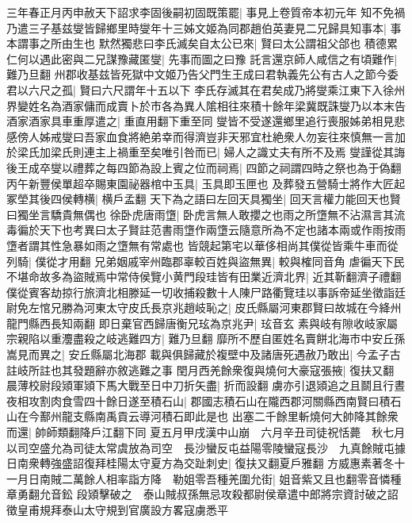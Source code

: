 三年春正月丙申赦天下詔求李固後嗣初固既策罷|{
	事見上卷質帝本初元年}
知不免禍乃遣三子基兹燮皆歸鄉里時燮年十三姊文姬為同郡趙伯英妻見二兄歸具知事本|{
	事本謂事之所由生也}
默然獨悲曰李氏滅矣自太公已來|{
	賢曰太公謂祖父郃也}
積德累仁何以遇此密與二兄謀豫藏匿燮|{
	先事而圖之曰豫}
託言還京師人咸信之有頃難作|{
	難乃旦翻}
州郡收基兹皆死獄中文姬乃告父門生王成曰君執義先公有古人之節今委君以六尺之孤|{
	賢曰六尺謂年十五以下}
李氏存滅其在君矣成乃將燮乘江東下入徐州界變姓名為酒家傭而成賣卜於市各為異人隂相往來積十餘年梁冀既誅燮乃以本末告酒家酒家具車重厚遣之|{
	重直用翻下重至同}
燮皆不受遂還鄉里追行喪服姊弟相見悲感傍人姊戒燮曰吾家血食將絶弟幸而得濟豈非天邪宜杜絶衆人勿妄往來慎無一言加於梁氏加梁氏則連主上禍重至矣唯引咎而已|{
	婦人之識丈夫有所不及焉}
燮謹從其誨後王成卒燮以禮葬之每四節為設上賓之位而祠焉|{
	四節之祠謂四時之祭也為于偽翻}
丙午新豐侯單超卒賜東園祕器棺中玉具|{
	玉具即玉匣也}
及葬發五營騎士將作大匠起冢塋其後四侯轉横|{
	横戶孟翻}
天下為之語曰左回天具獨坐|{
	回天言權力能回天也賢曰獨坐言驕貴無偶也}
徐卧虎唐雨墯|{
	卧虎言無人敢攖之也雨之所墯無不沾濕言其流毒徧於天下也考異曰太子賢註范書雨墯作兩墯云隨意所為不定也諸本兩或作雨按雨墯者謂其性急暴如雨之墯無有常處也}
皆競起第宅以華侈相尚其僕從皆乘牛車而從列騎|{
	僕從才用翻}
兄弟姻戚宰州臨郡辜較百姓與盜無異|{
	較與榷同音角}
虐徧天下民不堪命故多為盜賊焉中常侍侯覽小黄門段珪皆有田業近濟北界|{
	近其靳翻濟子禮翻}
僕從賓客劫掠行旅濟北相滕延一切收捕殺數十人陳尸路衢覽珪以事訴帝延坐徵詣廷尉免左悺兄勝為河東太守皮氏長京兆趙岐恥之|{
	皮氏縣屬河東郡賢曰故城在今絳州龍門縣西長知兩翻}
即日棄官西歸唐衡兄玹為京兆尹|{
	玹音玄}
素與岐有隙收岐家屬宗親陷以重灋盡殺之岐逃難四方|{
	難乃旦翻}
靡所不歷自匿姓名賣餅北海市中安丘孫嵩見而異之|{
	安丘縣屬北海郡}
載與俱歸藏於複壁中及諸唐死遇赦乃敢出|{
	今孟子古註岐所註也其發題辭亦敘逃難之事}
閏月西羌餘衆復與燒何大豪寇張掖|{
	復扶又翻}
晨薄校尉段熲軍熲下馬大戰至日中刀折矢盡|{
	折而設翻}
虜亦引退熲追之且鬬且行晝夜相攻割肉食雪四十餘日遂至積石山|{
	郡國志積石山在隴西郡河關縣西南賢曰積石山在今鄯州龍支縣南禹貢云導河積石即此是也}
出塞二千餘里斬燒何大帥降其餘衆而還|{
	帥師類翻降戶江翻下同}
夏五月甲戌漢中山崩　六月辛丑司徒祝恬薨　秋七月以司空盛允為司徒太常虞放為司空　長沙蠻反屯益陽零陵蠻寇長沙　九真餘賊屯據日南衆轉強盛詔復拜桂陽太守夏方為交趾刺史|{
	復扶又翻夏戶雅翻}
方威惠素著冬十一月日南賊二萬餘人相率詣方降　勒姐零吾種羌圍允街|{
	姐音紫又且也翻零音憐種章勇翻允音鈆}
段熲擊破之　泰山賊叔孫無忌攻殺都尉侯章遣中郎將宗資討破之詔徵皇甫規拜泰山太守規到官廣設方畧寇虜悉平

